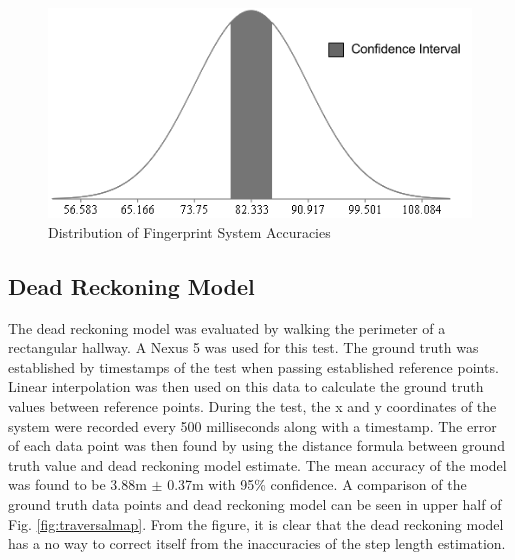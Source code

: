 \documentclass[conference]{IEEEtran}
\begin{document}
\begin{figure}[h]
\centering
\includegraphics[scale=0.65]{Normal_Distribution.png}
\caption{Distribution of Fingerprint System Accuracies}
\captionsetup{justification=centering,margin=2cm}
\label{fig:fingerprintdistribution}
\end{figure}

\subsection{Dead Reckoning Model}

The dead reckoning model was evaluated by walking the perimeter of a rectangular hallway. A Nexus 5 was used for this test. The ground truth was established by timestamps of the test when passing established reference points. Linear interpolation was then used on this data to calculate the ground truth values between reference points. During the test, the x and y coordinates of the system were recorded every 500 milliseconds along with a timestamp. The error of each data point was then found by using the distance formula between ground truth value and dead reckoning model estimate. The mean accuracy of the model was found to be 3.88m $\pm$ 0.37m with 95\% confidence. A comparison of the ground truth data points and dead reckoning model can be seen in upper half of Fig. \ref{fig:traversalmap}. From the figure, it is clear that the dead reckoning model has a no way to correct itself from the inaccuracies of the step length estimation.
\end{document}
